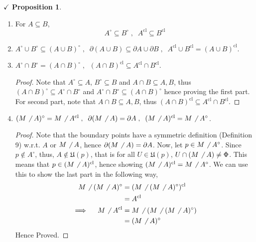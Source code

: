 \documentclass{article}
\theoremstyle{definition}
\theoremstyle{remark}
\theoremstyle{definition}
\theoremstyle{definition}
\newtheorem{proposition}{$\checkmark$ Proposition}
\newcommand{\nbdsys}[2]{\mathfrak{#1}(#2)}
\newcommand{\interior}[1]{#1^\circ}
\newcommand{\boundary}[1]{\partial #1}
\newcommand{\closure}[1]{#1^{\text{cl}}}
\begin{document}
\begin{proposition}
\begin{enumerate}
{\begin{proof}
\end{proof}
}
\item{For $ A\subseteq B $,
\[\interior{A} \subseteq \interior{B}\;,\;\;\closure{A}\subseteq \closure{B}\]
}
\item{$ \interior{A}\cup \interior{B} \subseteq \interior{(A\cup B)}\;,\;\;\boundary{(A\cup B)} \subseteq \boundary{A} \cup \boundary{B}\;,\;\; \closure{A}\cup \closure{B} = \closure{(A\cup B)} $.}
\item{$ \interior{A} \cap \interior{B} = \interior{(A\cap B)}\;,\;\;\closure{(A\cap B)} \subseteq \closure{A} \cap \closure{B} $.
\begin{proof}
	Note that $ \interior{A} \subseteq A$, $ \interior{B}\subseteq B $ and $ A\cap B \subseteq A,B $, thus $ \interior{(A\cap B)} \subseteq \interior{A}\cap \interior{B} $ and $ \interior{A} \cap \interior{B} \subseteq \interior{(A\cap B)} $ hence proving the first part. For second part, note that $ A\cap B \subseteq A,B $, thus $ \closure{(A\cap B)} \subseteq \closure{A}\cap \closure{B} $.
\end{proof}
}
\item{$ \interior{(M\not\;\;A)} = M\not\;\; \closure{A}\;,\;\;\boundary{(M\not\;\;A)}= \boundary{A}\;,\;\;\closure{(M\not\;\;A)} = M\not\;\;\interior{A}$.
\begin{proof}
	Note that the boundary points have a symmetric definition (Definition 9) w.r.t. $ A $ or $ M\not\;\;A $, hence $ \boundary{(M\not\;\;A)} = \boundary{A} $. Now, let $ p\in M\not\;\;\interior{A} $. Since $ p\notin \interior{A} $, thus, $ A\notin \nbdsys{U}{p} $, that is for all $ U\in \nbdsys{U}{p} $, $ U\cap(M\not\;\; A) \neq \Phi $. This means that $ p\in \closure{(M\not\;\;A)} $, hence showing $ \closure{(M\not\;\;A)} = M\not\;\;\interior{A}$. We can use this to show the last part in the following way,
	\begin{equation*}
		\begin{split}
			M\not\;\;\interior{(M\not\;\;A)} &= \closure{(M\not\;\;\interior{(M\not\;\;A)})} \\
				&= \closure{A}\\
				\implies \;\;\;\;M\not\;\;\closure{A} &= M\not\;\; (M\not\;\;\interior{(M\not\;\;A)})\\
				&= \interior{(M\not\;\;A)}
		\end{split}
	\end{equation*}
Hence Proved.
\end{proof}
}
	\end{enumerate}
\end{proposition}
\hrulefill
\newpage
\end{document}
